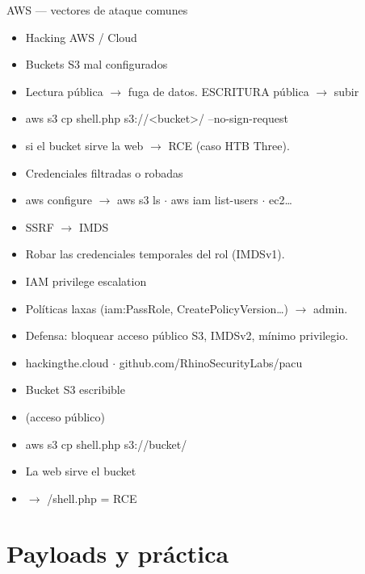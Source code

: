 \documentclass[aspectratio=169,10pt]{beamer}
\begin{document}
\begin{frame}[allowframebreaks]{AWS --- vectores de ataque comunes}
\small
  \begin{itemize}
  \item Hacking AWS / Cloud
  \item Buckets S3 mal configurados
  \item Lectura pública $\rightarrow$ fuga de datos. ESCRITURA pública $\rightarrow$ subir
  \item aws s3 cp shell.php s3://\textless{}bucket\textgreater{}/ --no-sign-request
  \item si el bucket sirve la web $\rightarrow$ RCE (caso HTB Three).
  \item Credenciales filtradas o robadas
  \item aws configure $\rightarrow$ aws s3 ls $\cdot$ aws iam list-users $\cdot$ ec2\dots{}
  \item SSRF $\rightarrow$ IMDS
  \item Robar las credenciales temporales del rol (IMDSv1).
  \item IAM privilege escalation
  \item Políticas laxas (iam:PassRole, CreatePolicyVersion\dots{}) $\rightarrow$ admin.
  \item Defensa: bloquear acceso público S3, IMDSv2, mínimo privilegio.
  \item hackingthe.cloud $\cdot$ github.com/RhinoSecurityLabs/pacu
  \item Bucket S3 escribible
  \item (acceso público)
  \item aws s3 cp shell.php s3://bucket/
  \item La web sirve el bucket
  \item $\rightarrow$ /shell.php = RCE
  \end{itemize}
\end{frame}

\section{Payloads y práctica}
\end{document}
